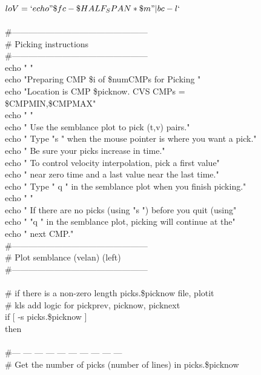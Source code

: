   $loV=`echo "\$fc - \$HALF_SPAN * \$m" | bc -l`$ \\
 \\
 \#------------------------------------------------ \\
  \# Picking instructions \\
  \#------------------------------------------------ \\
  echo " " \\
  echo "Preparing CMP \$i of \$numCMPs for Picking " \\
  echo "Location is CMP \$picknow. CVS CMPs =\\
 \$CMPMIN,\$CMPMAX" \\
  echo " " \\
  echo "  Use the semblance plot to pick (t,v) pairs." \\
  echo "  Type  "s " when the mouse pointer is where you want a pick." \\
  echo "  Be sure your picks increase in time." \\
  echo "  To control velocity interpolation, pick a first value" \\
  echo "    near zero time and a last value near the last time." \\
 echo "  Type  " q " in the semblance plot when you finish picking." \\
  echo " " \\
  echo " If there are no picks (using  "s ") before you quit (using" \\
  echo "  "q " in the semblance plot, picking will continue at the" \\
  echo " next CMP."   \\
  \#------------------------------------------------ \\
  \# Plot semblance (velan) (left) \\
  \#------------------------------------------------ \\
 \\
  \# if there is a non-zero length picks.\$picknow file, plotit \\
  \# kls add logic for pickprev, picknow, picknext \\
    if [ -s picks.\$picknow ] \\
    then \\
 \\
      \#---  ---  ---  ---  ---  ---  ---  ---  ---  --- \\
      \# Get the number of picks (number of lines) in picks.\$picknow \\
